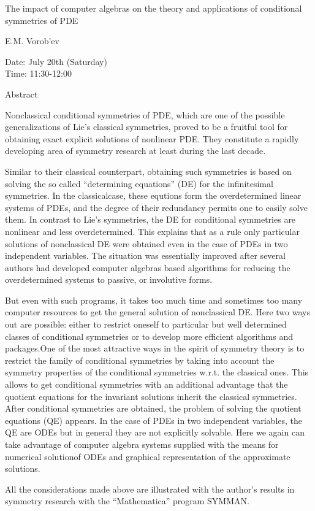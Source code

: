 \begin{center}
\LARGE
The impact of computer algebras on the theory and
        applications of conditional symmetries of PDE
\end{center}

\begin{center}
\Large
E.M. Vorob'ev

\end{center}

\noindent
Date:  July 20th (Saturday)\\
Time: 11:30-12:00\\

\begin{center}
\large
Abstract
\end{center}

Nonclassical conditional symmetries of PDE, which are one of the possible generalizations of
Lie's classical symmetries, proved to be a fruitful tool for obtaining exact explicit solutions of
nonlinear PDE. They constitute a rapidly developing area of symmetry research at least during the
last decade. 

Similar to their classical counterpart, obtaining such symmetries is based on solving the so called
``determining equations'' (DE) for the infinitesimal symmetries. In the classicalcase, these equtions
form the overdetermined linear systems of PDEs, and the degree of their redundancy permits one
to easily solve them. In contrast to Lie's symmetries, the DE for conditional symmetries are
nonlinear and less overdetermined. This explains that as a rule only particular solutions of
nonclassical DE were obtained even in the case of PDEs in two independent variables. The
situation was essentially improved after several authors had developed computer algebras based
algorithms for reducing the overdetermined systems to passive, or involutive forms. 

But even with such programs, it takes too much time and sometimes too many computer resources
to get the general solution of nonclassical DE. Here two ways out are possible: either to restrict
oneself to particular but well determined classes of conditional symmetries or to develop more
efficient algorithms and packages.One of the most attractive ways in the spirit of symmetry theory
is to restrict the family of conditional symmetries by taking into account the symmetry properties
of the conditional symmetries w.r.t. the classical ones. This allows to get conditional symmetries
with an additional advantage that the quotient equations for the invariant solutions inherit the
classical symmetries. After conditional symmetries are obtained, the problem of solving the
quotient equations (QE) appears. In the case of PDEs in two independent variables, the QE are
ODEs but in general they are not explicitly solvable. Here we again can take advantage of
computer algebra systems supplied with the means for numerical solutionof ODEs and graphical
representation of the approximate solutions. 

All the considerations made above are illustrated with the author's results in symmetry research
with the ``Mathematica'' program SYMMAN. 

